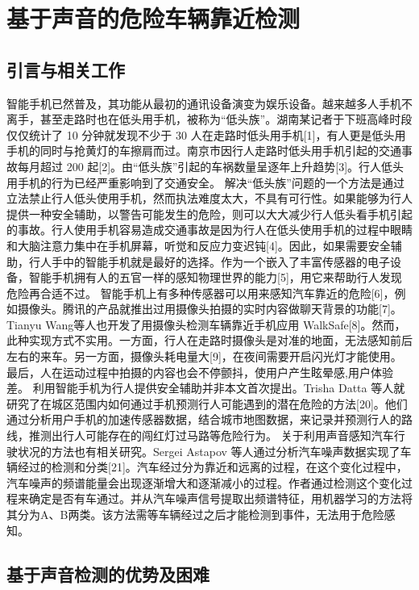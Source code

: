 \chapter{基于声音的危险车辆靠近检测}
\section{引言与相关工作}

智能手机已然普及，其功能从最初的通讯设备演变为娱乐设备。越来越多人手机不离手，甚至走路时也在低头用手机，被称为“低头族”。湖南某记者于下班高峰时段仅仅统计了 10 分钟就发现不少于 30 人在走路时低头用手机[1]，有人更是低头用手机的同时与抢黄灯的车擦肩而过。南京市因行人走路时低头用手机引起的交通事故每月超过 200 起[2]。由“低头族”引起的车祸数量呈逐年上升趋势[3]。行人低头用手机的行为已经严重影响到了交通安全。
解决“低头族”问题的一个方法是通过立法禁止行人低头使用手机，然而执法难度太大，不具有可行性。如果能够为行人提供一种安全辅助，以警告可能发生的危险，则可以大大减少行人低头看手机引起的事故。行人使用手机容易造成交通事故是因为行人在低头使用手机的过程中眼睛和大脑注意力集中在手机屏幕，听觉和反应力变迟钝[4]。因此，如果需要安全辅助，行人手中的智能手机就是最好的选择。作为一个嵌入了丰富传感器的电子设备，智能手机拥有人的五官一样的感知物理世界的能力[5]，用它来帮助行人发现危险再合适不过。
智能手机上有多种传感器可以用来感知汽车靠近的危险[6]，例如摄像头。腾讯的产品就推出过用摄像头拍摄的实时内容做聊天背景的功能[7]。Tianyu Wang等人也开发了用摄像头检测车辆靠近手机应用 WalkSafe[8]。然而，此种实现方式不实用。一方面，行人在走路时摄像头是对准的地面，无法感知前后左右的来车。另一方面，摄像头耗电量大[9]，在夜间需要开启闪光灯才能使用。最后，人在运动过程中拍摄的内容也会不停颤抖，使用户产生眩晕感,用户体验差。
利用智能手机为行人提供安全辅助并非本文首次提出。Trisha Datta 等人就研究了在城区范围内如何通过手机预测行人可能遇到的潜在危险的方法[20]。他们通过分析用户手机的加速传感器数据，结合城市地图数据，来记录并预测行人的路线，推测出行人可能存在的闯红灯过马路等危险行为。
关于利用声音感知汽车行驶状况的方法也有相关研究。Sergei Astapov 等人通过分析汽车噪声数据实现了车辆经过的检测和分类[21]。汽车经过分为靠近和远离的过程，在这个变化过程中，汽车噪声的频谱能量会出现逐渐增大和逐渐减小的过程。作者通过检测这个变化过程来确定是否有车通过。并从汽车噪声信号提取出频谱特征，用机器学习的方法将其分为A、B两类。该方法需等车辆经过之后才能检测到事件，无法用于危险感知。


\section{基于声音检测的优势及困难}

